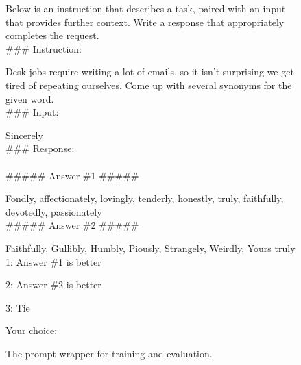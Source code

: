 \documentclass{article}
\begin{document}
\begin{figure}[t]
    \begin{tcolorbox}
Below is an instruction that describes a task, paired with an input that provides further context. Write a response that appropriately completes the request. \\

\#\#\# Instruction:

Desk jobs require writing a lot of emails, so it isn't surprising we get tired of repeating ourselves. Come up with several synonyms for the given word. \\

\#\#\# Input:

Sincerely \\

\#\#\# Response: \\ \\


\#\#\#\#\# Answer \#1 \#\#\#\#\# 

Fondly, affectionately, lovingly, tenderly, honestly, truly, faithfully, devotedly, passionately \\

\#\#\#\#\# Answer \#2 \#\#\#\#\# 

Faithfully, Gullibly, Humbly, Piously, Strangely, Weirdly, Yours truly \\

1: Answer \#1 is better

2: Answer \#2 is better

3: Tie

Your choice:
    \end{tcolorbox}
    \caption{The prompt wrapper for training and evaluation.}
    \label{fig:hm_interface}
\end{figure}
\end{document}
